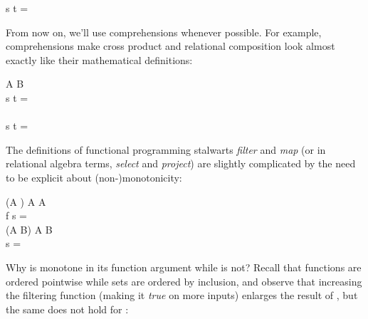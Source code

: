 \begin{code}
  \mvar s \cap \mvar t =
\end{code}

\noindent From now on, we'll use comprehensions whenever possible. For example, comprehensions make cross product and relational composition look almost exactly like their mathematical definitions:

\begin{code}
  \pwild \x \pwild \isa \tseteq A \to \tseteq B \to {}\\
  \mvar s \x \mvar t =
  \\[\betweenfunctionskip]
  \pwild \compose \pwild \isa
  \to {}
  \to {}\\
  \mvar s \compose \mvar t = 
\end{code}

\noindent
The definitions of functional programming stalwarts \emph{filter} and \emph{map}
(or in relational algebra terms, \emph{select} and \emph{project}) are slightly
complicated by the need to be explicit about
(non-\nolinebreak[4])\linebreak[0]monotonicity:

\newcommand{\kernf}{\kern1.67pt f}
\newcommand{\kernfpost}{\kern.3pt}
\renewcommand{\kernf}{f}
\renewcommand{\kernfpost}{\kern.4pt}

\begin{code}
   \isa (\iso \eqt A \to \tbool) \to \tseteq A \to \tseteq A\\
   \<\mvar f \<\mvar s =
  \\[\betweenfunctionskip]
   \isa \iso(\iso \eqt A \to \eqt B) \to \tseteq A \to \tseteq B\\
   \<\pboxvar{\kernf\kernfpost} \<\mvar s = \esetfor{\dvar{\kernf}\<\ebox{\dvar x}}{\dvar x \in \mvar s}
\end{code}

\noindent
Why is  monotone in its function argument while  is not? Recall that functions are ordered pointwise while sets are ordered by inclusion, and observe that increasing the filtering function (making it \emph{true} on more inputs) enlarges the result of , but the same does not hold for : 

